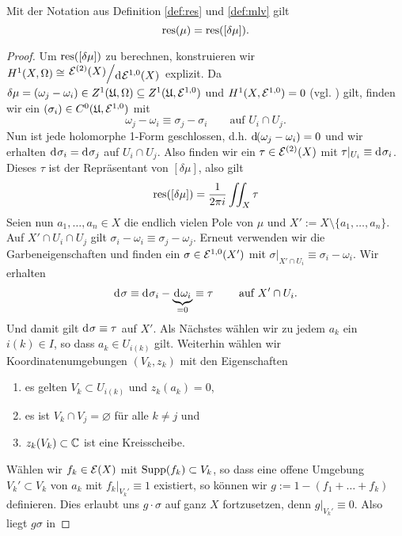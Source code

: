 \begin{thm}
  \label{thm:res}
  Mit der Notation aus Definition \ref{def:res} und \ref{def:mlv} gilt
  \[
  \operatorname{res}(\mu) = \operatorname{res}([\delta \mu]).
  \]
\end{thm}

\begin{proof}
  Um $\operatorname{res}([\delta \mu])$ zu berechnen, konstruieren wir $H^1(X,
  \Omega) \cong \quot{\diff^{(2)}(X)}{\d[\diff^{1,0}(X)]}$
  explizit. Da $\delta \mu = (\omega_j - \omega_i) \in Z^1(\mathfrak{U},
  \Omega) \subseteq Z^1(\mathfrak{U}, \mathcal{E}^{1,0})$ und $H^1(X, \mathcal{E}^{1,0}) =
  0$ (vgl. \cite[Satz 12.6]{For}) gilt, finden wir ein
  $(\sigma_i) \in C^0(\mathfrak{U}, \mathcal{E}^{1,0})$ mit
  \[
  \omega_j - \omega_i \equiv \sigma_j - \sigma_i \qquad \text{auf } U_i
  \cap U_j.
  \]
  Nun ist jede holomorphe 1-Form geschlossen, d.h. $\d[(\omega_j -
  \omega_i)] = 0$ und wir erhalten $\d[\sigma_i] = \d[\sigma_j]$ auf
  $U_i \cap U_j$. Also finden wir ein $ \tau \in \mathcal{E}^{(2)}(X)$ mit
  $\tau|_{U_i} \equiv \d[\sigma_i]$. Dieses $\tau$ ist der Repräsentant
  von $[\delta \mu]$, also gilt
  \[
  \operatorname{res}([\delta \mu]) = \frac{1}{2\pi i} \iint_X \tau
  \]
  Seien nun $a_1, \dots, a_n \in X$ die endlich vielen Pole von $\mu$
  und $X' := X \setminus \{a_1, \dots, a_n\}$. Auf $X' \cap U_i \cap
  U_j$ gilt $\sigma_i - \omega_i \equiv \sigma_j - \omega_j$. Erneut
  verwenden wir die Garbeneigenschaften und finden ein $\sigma \in
  \mathcal{E}^{1,0}(X')$ mit $\sigma|_{X' \cap U_i} \equiv \sigma_i -
  \omega_i$. Wir erhalten
  \[
  \d[\sigma] \equiv \d[\sigma_i] - \underbrace{\d[\omega_i]}_{= 0} \equiv \tau
  \qquad \text{ auf } X' \cap U_i.
  \]
  Und damit gilt $\d[\sigma] \equiv \tau$ auf $X'$. Als Nächstes
  wählen wir zu jedem $a_k$ ein $i(k) \in I$, so dass $a_k \in
  U_{i(k)}$ gilt. Weiterhin wählen wir Koordinatenumgebungen $(V_k,
  z_k)$ mit den Eigenschaften
  \begin{enumerate}
  \item es gelten $V_k \subset U_{i(k)}$ und $z_k(a_k) = 0$,
  \item es ist $V_k \cap V_j = \varnothing$ für alle $k \neq j$ und
  \item $z_k(V_k) \subset \mathbb{C}$ ist eine Kreisscheibe.
  \end{enumerate}
  Wählen wir $f_k \in \mathcal{E}(X)$ mit $\operatorname{Supp}(f_k) \subset V_k$, so
  dass eine offene Umgebung $V_k' \subset V_k$ von $a_k$ mit
  $f_k|_{V_k'} \equiv 1$ existiert, so können wir $g:= 1 - (f_1 + \dots + f_k)$
  definieren. Dies erlaubt uns $g \cdot \sigma$ auf ganz $X$
  fortzusetzen, denn $g|_{V_k'} \equiv 0$. Also liegt $g \sigma$ in

\end{proof}
